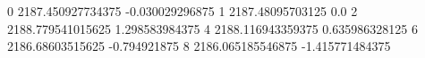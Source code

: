 0 2187.450927734375 -0.030029296875
1 2187.48095703125 0.0
2 2188.779541015625 1.298583984375
4 2188.116943359375 0.635986328125
6 2186.68603515625 -0.794921875
8 2186.065185546875 -1.415771484375
